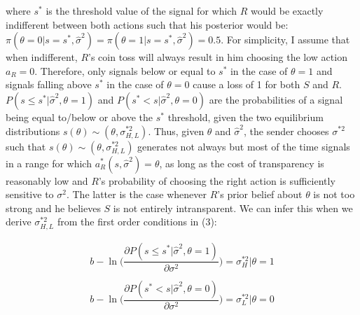 \documentclass[paper=a4,12pt,DIV=11,twoside=false]{scrartcl}
\begin{document}
\noindent where $s^{*}$ is the threshold value of the signal for which $R$ would be exactly indifferent between both actions such that his posterior would be: $\pi(\theta = 0|s = s^{*},\hat{\sigma}^2)=\pi(\theta = 1|s = s^{*},\hat{\sigma}^2)=0.5$. For simplicity, I assume that when indifferent, $R$'s coin toss will always result in him choosing the low action $a_{R}=0$. Therefore, only signals below or equal to $s^{*}$ in the case of $\theta=1$ and signals falling above $s^{*}$ in the case of $\theta=0$ cause a loss of 1 for both $S$ and $R$. $P(s \leq s^{*}|\hat{\sigma}^2,\theta=1)$ and $P(s^{*} < s|\hat{\sigma}^2,\theta=0)$ are the probabilities of a signal being equal to/below or above the $s^{*}$ threshold, given the two equilibrium distributions $s(\theta)\sim(\theta, \sigma^{*2}_{H,L})$. Thus, given $\theta$ and $\hat{\sigma}^2$, the sender chooses $\sigma^{*2}$ such that $s(\theta)\sim(\theta, \sigma^{*2}_{H,L})$ generates not always but most of the time signals in a range for which $a_{R}^{*}(s,\hat{\sigma}^2)=\theta$, as long as the cost of transparency is reasonably low and $R$'s probability of choosing the right action is sufficiently sensitive to $\sigma^2$. The latter is the case whenever $R$'s prior belief about $\theta$ is not too strong and he believes $S$ is not entirely intransparent. We can infer this when we derive $\sigma^{*2}_{H,L}$ from the first order conditions in (3):

\begin{equation}
\begin{array}{ll}
b - \ln{\Big(\dfrac{\partial P(s \leq s^{*}|\hat{\sigma}^2,\theta=1)}{\partial \sigma^{2}}\Big)} = \sigma^{*2}_H|\theta=1\\
\\
b - \ln{\Big(\dfrac{\partial P(s^{*} < s|\hat{\sigma}^2,\theta=0)}{\partial \sigma^{2}}\Big)} = \sigma^{*2}_L|\theta=0
\end{array}
\end{equation}
\end{document}
